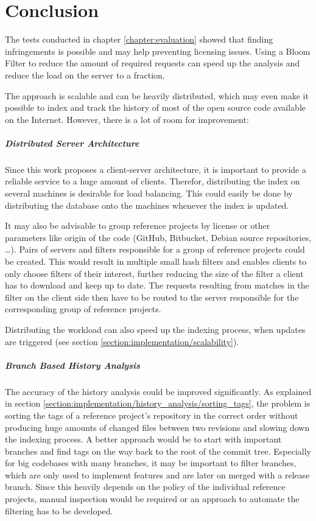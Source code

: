 
\chapter{Conclusion}\label{chapter:conclusion}
The tests conducted in chapter \ref{chapter:evaluation} showed that finding infringements is possible and may help preventing licensing issues.
Using a Bloom Filter to reduce the amount of required requests can speed up the analysis and reduce the load on the server to a fraction.

The approach is scalable and can be heavily distributed, which may even make it possible to index and track the history of most of the open source code available on the Internet.
However, there is a lot of room for improvement:

\paragraph{Distributed Server Architecture}
Since this work proposes a client-server architecture, it is important to provide a reliable service to a huge amount of clients.
Therefor, distributing the index on several machines is desirable for load balancing.
This could easily be done by distributing the database onto the machines whenever the index is updated.

It may also be advisable to group reference projects by license or other parameters like origin of the code (GitHub, Bitbucket, Debian source repositories, \dots).
Pairs of servers and filters responsible for a group of reference projects could be created.
This would result in multiple small hash filters and enables clients to only choose filters of their interest, further reducing the size of the filter a client has to download and keep up to date.
The requests resulting from matches in the filter on the client side then have to be routed to the server responsible for the corresponding group of reference projects.

Distributing the workload can also speed up the indexing process, when updates are triggered (see section \ref{section:implementation/scalability}).

\paragraph{Branch Based History Analysis}
The accuracy of the history analysis could be improved significantly.
As explained in section \ref{section:implementation/history_analysis/sorting_tags}, the problem is sorting the tags of a reference project's repository in the correct order without producing huge amounts of changed files between two revisions and slowing down the indexing process.
A better approach would be to start with important branches and find tags on the way back to the root of the commit tree.
Especially for big codebases with many branches, it may be important to filter branches, which are only used to implement features and are later on merged with a release branch.
Since this heavily depends on the policy of the individual reference projects, manual inspection would be required or an approach to automate the filtering has to be developed.


